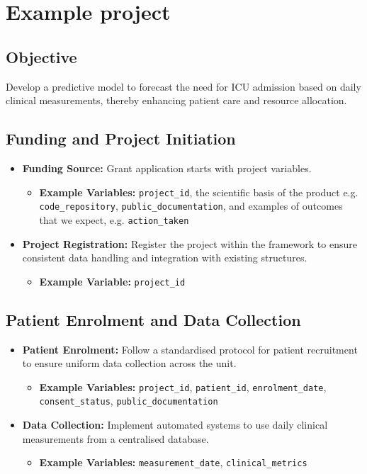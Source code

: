 \section{Example project}

\subsection*{Objective}
Develop a predictive model to forecast the need for ICU admission based on daily clinical measurements, thereby enhancing patient care and resource allocation.

\subsection*{Funding and Project Initiation}
\begin{itemize}
    \item \textbf{Funding Source:} Grant application starts with project variables.
        \begin{itemize}
        \item \textbf{Example Variables:} \texttt{project\_id}, the scientific basis of the product e.g. \texttt{code\_repository}, \texttt{public\_documentation},
    and examples of outcomes that we expect, e.g. \texttt{action\_taken}
    \end{itemize}
    \item \textbf{Project Registration:} Register the project within the \pmu framework to ensure consistent data handling and integration with existing structures.
    \begin{itemize}
        \item \textbf{Example Variable:} \texttt{project\_id}
    \end{itemize}
\end{itemize}

\subsection*{Patient Enrolment and Data Collection}
\begin{itemize}
    \item \textbf{Patient Enrolment:} Follow a standardised protocol for patient recruitment to ensure uniform data collection across the unit.
    \begin{itemize}
        \item \textbf{Example Variables:}  \texttt{project\_id}, \texttt{patient\_id}, \texttt{enrolment\_date}, \texttt{consent\_status}, \texttt{public\_documentation}
    \end{itemize}
    \item \textbf{Data Collection:} Implement automated systems to use daily clinical measurements from a centralised database.
    \begin{itemize}
        \item \textbf{Example Variables:} \texttt{measurement\_date}, \texttt{clinical\_metrics}
    \end{itemize}
\end{itemize}

